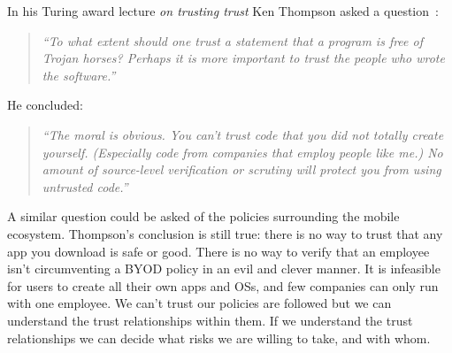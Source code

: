 \documentclass[thesis.tex]{subfiles}
\begin{document}
\hspace{1em}

\noindent In his Turing award lecture \emph{on trusting trust} Ken Thompson asked a
question~\cite{ken_thompson_reflections_1984}:
\begin{quotation}\itshape\noindent
  ``To what extent should one trust a statement that a program is free of Trojan
  horses? Perhaps it is more important to trust the people who wrote the
  software.''
\end{quotation}
He concluded:
\begin{quotation}\itshape
  ``The moral is obvious. You can't trust code that you did not totally create
  yourself. (Especially code from companies that employ people like me.)
  No amount of source-level verification or scrutiny will protect you from using untrusted code.''
\end{quotation} 
A similar question could be asked of the policies surrounding the mobile
ecosystem. Thompson's conclusion is still true: there is no way to trust that
any app you download is safe or good. There is no way to verify that an employee
isn't circumventing a BYOD policy in an evil and clever manner. It is infeasible
for users to create all their own apps and OSs, and few companies can only run
with one employee. We can't trust our policies are followed but we can
understand the trust relationships within them. If we understand the trust
relationships we can decide what risks we are willing to take, and with whom.
\end{document}
